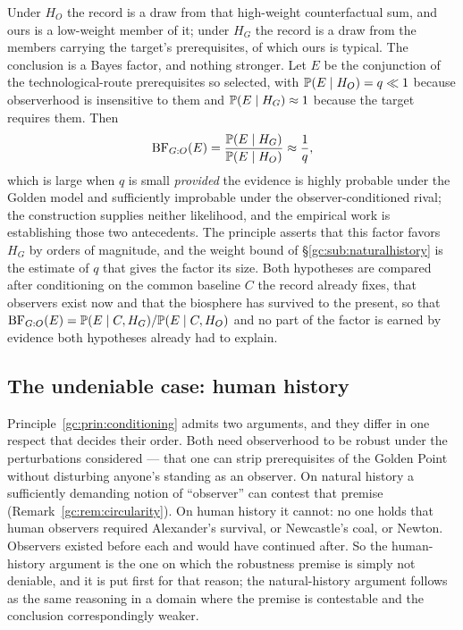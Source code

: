 \begin{principle}
Under $H_O$ the record is a draw from that high-weight counterfactual
sum, and ours is a low-weight member of it; under $H_G$ the record is a
draw from the members carrying the target's prerequisites, of which ours
is typical. The conclusion is a Bayes factor, and nothing stronger. Let $E$ be the
conjunction of the technological-route prerequisites so selected, with
$\mathbb{P}(E\mid H_O)=q\ll1$ because observerhood is insensitive to them and
$\mathbb{P}(E\mid H_G)\approx1$ because the target requires them. Then
\begin{equation}\label{gc:eq:bfGO}
\mathrm{BF}_{G:O}(E)=\frac{\mathbb{P}(E\mid H_G)}{\mathbb{P}(E\mid H_O)}\approx\frac1q,
\end{equation}
which is large when $q$ is small \emph{provided} the evidence is highly probable under the Golden model and sufficiently improbable under the observer-conditioned rival; the construction supplies neither likelihood, and the empirical work is establishing those two antecedents.
The principle asserts that this factor favors $H_G$ by orders of
magnitude, and the weight bound of \S\ref{gc:sub:naturalhistory} is
the estimate of $q$ that gives the factor its size. Both hypotheses are
compared after conditioning on the common baseline $C$ the record
already fixes, that observers exist now and that the biosphere has
survived to the present, so that $\mathrm{BF}_{G:O}(E)=\mathbb{P}(E\mid
C,H_G)/\mathbb{P}(E\mid C,H_O)$ and no part of the factor is earned by
evidence both hypotheses already had to explain.
\end{principle}

\subsection{The undeniable case: human history}\label{gc:sub:humanhistory}

Principle~\ref{gc:prin:conditioning} admits two arguments, and they
differ in one respect that decides their order. Both need observerhood
to be robust under the perturbations considered --- that one can strip
prerequisites of the Golden Point without disturbing anyone's standing
as an observer. On natural history a sufficiently demanding notion of
``observer'' can contest that premise (Remark~\ref{gc:rem:circularity}).
On human history it cannot: no one holds that human observers required
Alexander's survival, or Newcastle's coal, or Newton. Observers existed
before each and would have continued after. So the human-history
argument is the one on which the robustness premise is simply not
deniable, and it is put first for that reason; the natural-history
argument follows as the same reasoning in a domain where the premise is
contestable and the conclusion correspondingly weaker.

